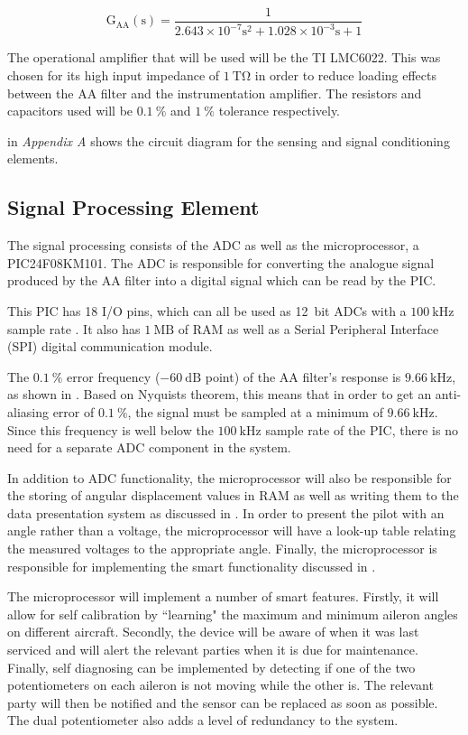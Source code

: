 \documentclass[10pt,twocolumn]{witseiepaper}
\begin{document}
\begin{equation}
\mathrm{G_{AA}(s) = \frac{1}{2.643 \times 10^{-7} s^2 + 1.028 \times 10^{-3} s + 1} }
\label{eqn:aafilter}
\end{equation}

The operational amplifier that will be used will be the TI LMC6022. This was chosen for its high input impedance of $1~\mathrm{T\Omega}$ \cite{lmc6022} in order to reduce loading effects between the AA filter and the instrumentation amplifier. The resistors and capacitors used will be $0.1~\%$ and $1~\%$ tolerance respectively. 

 in \textit{Appendix A} shows the circuit diagram for the sensing and signal conditioning elements.

\subsection{Signal Processing Element}

The signal processing consists of the ADC as well as the microprocessor, a PIC24F08KM101. The ADC is responsible for converting the analogue signal produced by the AA filter into a digital signal which can be read by the PIC.

This PIC has 18 I/O pins, which can all be used as 12~bit ADCs with a $100~\mathrm{kHz}$ sample rate \cite{PIC}. It also has $1~\mathrm{MB}$ of RAM as well as a Serial Peripheral Interface (SPI) digital communication module.

The $0.1~\%$ error frequency ($-60~\mathrm{dB}$ point) of the AA filter's response is $9.66~\mathrm{kHz}$, as shown in . Based on Nyquists theorem, this means that in order to get an anti-aliasing error of $0.1~\%$, the signal must be sampled at a minimum of $9.66~\mathrm{kHz}$. Since this frequency is well below the $100~\mathrm{kHz}$ sample rate of the PIC, there is no need for a separate ADC component in the system.  

In addition to ADC functionality, the microprocessor will also be responsible for the storing of angular displacement values in RAM as well as writing them to the data presentation system as discussed in . In order to present the pilot with an angle rather than a voltage, the microprocessor will have a look-up table relating the measured voltages to the appropriate angle. Finally, the microprocessor is responsible for implementing the smart functionality discussed in .

The microprocessor will implement a number of smart features. Firstly, it will allow for self calibration by ``learning" the maximum and minimum aileron angles on different aircraft. Secondly, the device will be aware of when it was last serviced and will alert the relevant parties when it is due for maintenance. Finally, self diagnosing can be implemented by detecting if one of the two potentiometers on each aileron is not moving while the other is. The relevant party will then be notified and the sensor can be replaced as soon as possible. The dual potentiometer also adds a level of redundancy to the system.  
\end{document}
